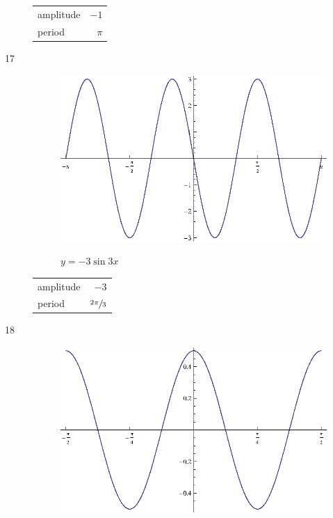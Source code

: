 \documentclass{exam}
\begin{document}
\begin{description}
        \begin{tabular}[H]{lr}
          \toprule
          amplitude & $-1$ \\
          period    & $\pi$ \\
          \bottomrule
        \end{tabular}

      \item[17]
        \begin{figure}[H]
          \centering
          \includegraphics[scale=0.9]{exercise17.eps}

          $y = - 3 \sin 3x$
        \end{figure}

        \begin{tabular}[H]{lr}
          \toprule
          amplitude & $-3$ \\
          period    & $\sfrac{2 \pi}{3}$ \\
          \bottomrule
        \end{tabular}

      \item[18]
        \begin{figure}[H]
          \centering
          \includegraphics[scale=0.9]{exercise18.eps}


\end{figure}
\end{description}
\end{document}
